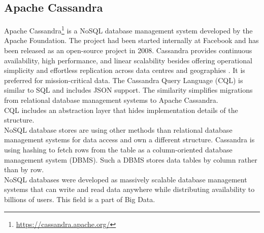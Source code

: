 \subsection{Apache Cassandra}\label{Cassandra-Intro}

Apache Cassandra\footnote{\url{https://cassandra.apache.org/}} is a NoSQL database management system developed by the Apache Foundation. The project had been started internally at Facebook and has been released as an open-source project in 2008. Cassandra provides continuous availability, high performance, and linear scalability besides  offering operational simplicity and effortless replication across data centres and geographies \cite{Datastax}. It is preferred for mission-critical data. The Cassandra Query Language (CQL) is similar to SQL and includes JSON support. The similarity simplifies migrations from relational database management systems to Apache Cassandra. \\ 
CQL includes an abstraction layer that hides implementation details of the structure.  \\
NoSQL database stores are using other methods than relational database management systems for data access and own a different structure. Cassandra is using hashing to fetch rows from the table as a column-oriented database management system (DBMS). Such a DBMS stores data tables by column rather than by row. \\ 
NoSQL databases were developed as massively scalable database management systems that can write and read data anywhere while distributing availability to billions of users. This field is a part of Big Data.